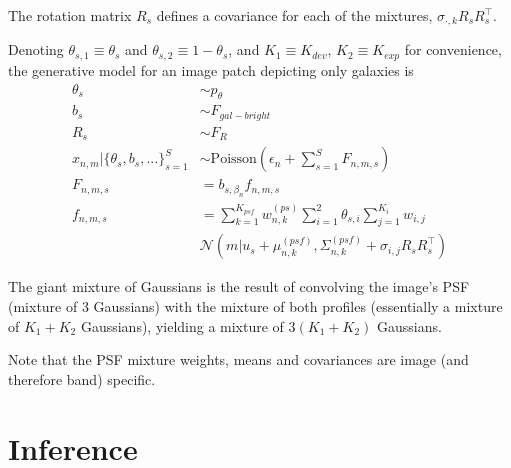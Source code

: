 \documentclass[11pt]{article}
\newcommand{\trans}{\intercal}
\begin{document}
The rotation matrix $R_s$ defines a covariance for each of the mixtures, $\sigma_{\cdot, k} R_s R_s^\trans$. 

Denoting $\theta_{s,1} \equiv \theta_{s}$ and $\theta_{s,2} \equiv 1-\theta_{s}$, and $K_1 \equiv K_{dev}$, $K_2 \equiv K_{exp}$ for convenience, the generative model for an image patch depicting only galaxies is 
\begin{align}
  \theta_s &\sim p_\theta \\
  b_s      &\sim F_{gal-bright} \\
  R_s      &\sim F_{R} \\
  x_{n,m} | \{ \theta_s, b_s,...\}_{s=1}^S &\sim \textrm{Poisson}\left( \epsilon_n + \sum_{s=1}^S F_{n,m,s} \right) \\
  F_{n,m,s} &= b_{s, \beta_n} f_{n,m,s} \\
  f_{n,m,s} 
    &= \sum_{k=1}^{K_{psf}} w^{(ps)}_{n,k} 
       \sum_{i=1}^2 \theta_{s,i} 
       \sum_{j=1}^{K_i} w_{i, j} \\
       & \mathcal{N} \left(m | u_s + \mu^{(psf)}_{n,k}, \Sigma^{(psf)}_{n,k} + \sigma_{i,j} R_s R_s^\trans \right)
\end{align}

The giant mixture of Gaussians is the result of convolving the image's PSF (mixture of 3 Gaussians) with the mixture of both profiles (essentially a mixture of $K_1 + K_2$ Gaussians), yielding a mixture of $3(K_1 + K_2)$ Gaussians.  
 
Note that the PSF mixture weights, means and covariances are image (and therefore band) specific. 


\section{Inference}
\end{document}
